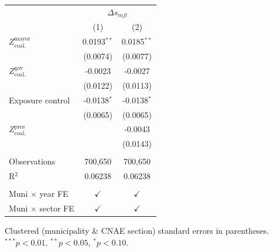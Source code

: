 \begingroup
\centering
\begin{tabular}{lcc}
   \toprule
    & \multicolumn{2}{c}{$\Delta s_{mjt}$}\\
                                       & (1)           & (2)\\  
   \midrule 
   $Z^{\text{mayor}}_{\text{coal.}}$   & 0.0193$^{**}$ & 0.0185$^{**}$\\   
                                       & (0.0074)      & (0.0077)\\   
   $Z^{\text{gov}}_{\text{coal.}}$     & -0.0023       & -0.0027\\   
                                       & (0.0122)      & (0.0113)\\   
   Exposure control                    & -0.0138$^{*}$ & -0.0138$^{*}$\\   
                                       & (0.0065)      & (0.0065)\\   
   $Z^{\text{pres}}_{\text{coal.}}$    &               & -0.0043\\   
                                       &               & (0.0143)\\   
    \\
   Observations                        & 700,650       & 700,650\\  
   R$^2$                               & 0.06238       & 0.06238\\  
    \\
   Muni $\times$ year FE               & $\checkmark$  & $\checkmark$\\   
   Muni $\times$ sector FE             & $\checkmark$  & $\checkmark$\\   
   \bottomrule
\end{tabular}
 
\par \raggedright 
Clustered (municipality \& CNAE section) standard errors in parentheses. $^{***}p<0.01$, $^{**}p<0.05$, $^{*}p<0.10$.
\par\endgroup
